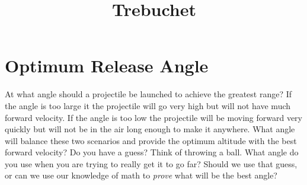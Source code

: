 \documentclass[10pt,a4paper]{article}
\begin{document}
\title{Trebuchet}
	\section{Optimum Release Angle}
		At what angle should a projectile be launched to achieve the greatest range?
		If the angle is too large it the projectile will go very high but will not have much forward velocity.
		If the angle is too low the projectile will be moving forward very quickly but will not be in the air long enough to make it anywhere.
		What angle will balance these two scenarios and provide the optimum altitude with the best forward velocity?
		Do you have a guess? Think of throwing a ball. What angle do you use when you are trying to really get it to go far?
		Should we use that guess, or can we use our knowledge of math to \emph{prove} what will be the best angle?
\end{document}
